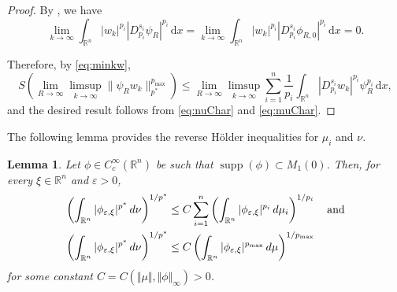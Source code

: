 \documentclass[11pt]{amsart}
\theoremstyle{plain}
\newtheorem{lemma}[theorem]{Lemma}
\theoremstyle{definition}
\numberwithin{equation}{section}
\renewcommand{\d}{\textnormal{d}}
\newcommand{\R}{\mathbb{R}}
\DeclareMathOperator{\supp}{supp}
\newcommand{\eps}{\varepsilon}
\begin{document}
\begin{proof}
By , we have
\begin{equation*}
\lim_{k \to \infty} \int_{\mathbb{R}^n} |w_k|^{p_i} |D^{s_i}_{p_i} \psi_R|^{p_i} \, \mathrm{d}x = \lim_{k \to \infty} \int_{\mathbb{R}^n} |w_k|^{p_i} |D^{s_i}_{p_i} \phi_{R,0}|^{p_i} \, \mathrm{d}x = 0.
\end{equation*}

Therefore, by \eqref{eq:minkw},
\begin{equation*}
S \left( \lim_{R \to \infty} \limsup_{k \to \infty} \|\psi_R w_k\|_{p^{\ast}}^{p_{\max}} \right) \leq  \lim_{R \to \infty} \limsup_{k \to \infty} \sum_{i=1}^n \frac{1}{p_i} \int_{\mathbb{R}^n} |D^{s_i}_{p_i}w_k|^{p_i} \psi_R^{p_i} \,\mathrm{d}x,
\end{equation*}
and the desired result follows from \eqref{eq:nuChar} and \eqref{eq:muChar}.
\end{proof}

The following lemma provides the reverse H\"older inequalities for $\mu_i$ and $\nu$.

\begin{lemma}
\label{lem:revHolder}
Let $\phi \in C_c^{\infty}(\R^n)$ be such that $\supp(\phi) \subset M_1(0)$. Then, for every $\xi \in \R^n$ and $\eps > 0$,
\begin{align}
\label{eq:revHolder1}
\left( \int_{\R^n} \vert \phi_{\eps,\xi} \vert^{p^{\ast}} \, \d \nu\right)^{1/p^{\ast}} &\le C \sum_{i=1}^n \left(\int_{\R^n} \vert\phi_{\eps,\xi}\vert^{p_i} \, \d \mu_i \right)^{1/p_i} \quad\text{and}\\
\label{eq:revHolder2}
\left( \int_{\R^n} \vert \phi_{\eps,\xi} \vert^{p^{\ast}}  \, \d \nu\right)^{1/p^{\ast}} &\le C \left(\int_{\R^n} \vert\phi_{\eps,\xi}\vert^{p_{\max}}  \, \d \mu \right)^{1/p_{\max}}
\end{align} 
for some constant $C = C(\Vert \mu\Vert,\Vert \phi\Vert_{\infty}) >0$.
\end{lemma}
\end{document}
